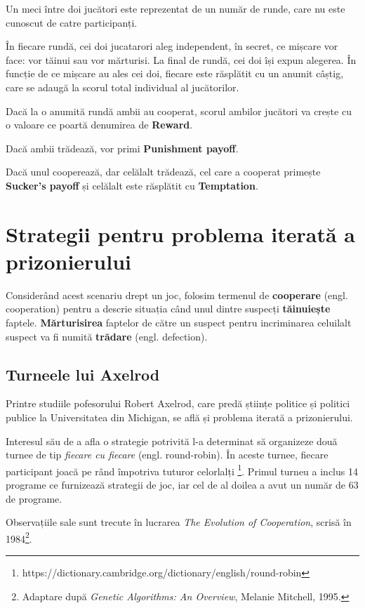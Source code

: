 Un meci între doi jucători este reprezentat de un număr de runde, care nu este cunoscut de catre participanți.

În fiecare rundă, cei doi jucatarori aleg independent, în secret, ce mișcare vor face: vor tăinui sau vor mărturisi. La final de rundă, cei doi își expun alegerea. În funcție de ce mișcare au ales cei doi, fiecare este răsplătit cu un anumit câștig, care se adaugă la scorul total individual al jucătorilor. 

Dacă la o anumită rundă ambii au cooperat, scorul ambilor jucători va crește cu o valoare ce poartă denumirea de \textbf{Reward}. 

Dacă ambii trădează, vor primi \textbf{Punishment payoff}. 

Dacă unul cooperează, dar celălalt trădează, cel care a cooperat primește \textbf{Sucker's payoff} și celălalt este răsplătit cu \textbf{Temptation}. 

\section {Strategii pentru problema iterată a prizonierului}

Considerând acest scenariu drept un joc, folosim termenul de \textbf{cooperare} (engl. cooperation) pentru a descrie situația când unul dintre suspecți \textbf{tăinuiește} faptele. \textbf{Mărturisirea} faptelor de către un suspect pentru incriminarea celuilalt suspect va fi numită \textbf{trădare} (engl. defection). 

\subsection{Turneele lui Axelrod}

Printre studiile pofesorului Robert Axelrod, care predă științe politice și politici publice la Universitatea din Michigan, se află și problema iterată a prizonierului.

Interesul său de a afla o strategie potrivită l-a determinat să organizeze două turnee de tip \textit{fiecare cu fiecare} (engl. round-robin). În aceste turnee, fiecare participant joacă pe rând împotriva tuturor celorlalți \footnote{https://dictionary.cambridge.org/dictionary/english/round-robin}.  Primul turneu a inclus 14 programe ce furnizează strategii de joc, iar cel de al doilea a avut un număr de 63 de programe.

Observațiile sale sunt trecute în lucrarea \textit{The Evolution of Cooperation}, scrisă în 1984\footnote{Adaptare după \textit{Genetic Algorithms: An Overview}, Melanie Mitchell, 1995.}.

